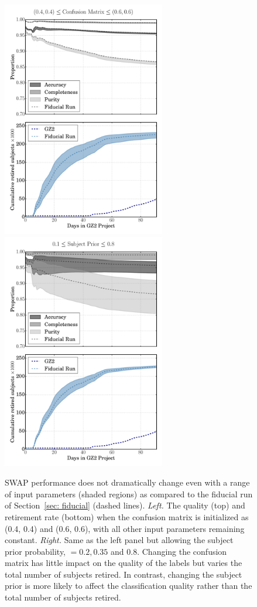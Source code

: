 \begin{figure}
\includegraphics[width=2.8in]{Figures/human_machine/A1a.pdf}
\includegraphics[width=2.8in]{Figures/human_machine/A1b.pdf}
\caption[SWAP's performance is robust to changes in initial volunteer confusion matrix and subject prior.]{SWAP performance does not dramatically change even with a range of input parameters (shaded regions) as compared to the fiducial run of Section~\ref{sec: fiducial} (dashed lines).  \textit{Left.} The quality (top) and retirement rate (bottom) when the confusion matrix is initialized as (0.4, 0.4) and (0.6, 0.6), with all other input parameters remaining constant. \textit{Right.} Same as the left panel but allowing the subject prior probability, \p $= 0.2, 0.35$ and $0.8$. Changing the confusion matrix has little impact on the quality of the labels but varies the total number of subjects retired. In contrast, changing the subject prior is more likely to affect the classification quality rather than the total number of subjects retired. \label{fig: tweak swap}}
\end{figure}

